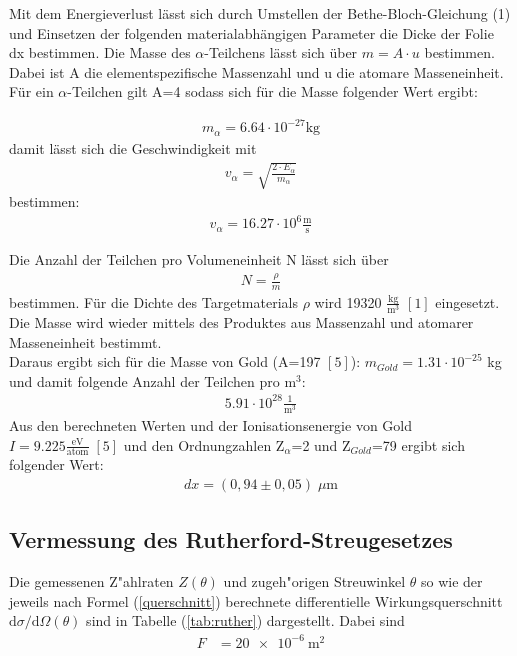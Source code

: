 Mit dem Energieverlust lässt sich durch Umstellen der Bethe-Bloch-Gleichung (1) und Einsetzen der folgenden materialabhängigen Parameter die Dicke der Folie dx bestimmen.  
Die Masse des $\alpha$-Teilchens lässt sich über $m=A \cdot u$ bestimmen. Dabei ist A die elementspezifische Massenzahl und u die atomare Masseneinheit. Für ein $\alpha$-Teilchen gilt A=4 sodass sich für die Masse folgender Wert ergibt: 

\begin{align*}
m_{\alpha}= 6.64 \cdot 10^{-27} \text{kg} 
\end{align*} 
damit lässt sich die Geschwindigkeit mit \begin{align*}
v_{\alpha}= \sqrt{\frac{2\cdot E_{\alpha}}{m_{\alpha}}} 
\end{align*} 
bestimmen:
\begin{align*}
v_{\alpha}=16.27 \cdot 10^{6} \frac{\text{m}}{\text{s}}
\end{align*} 

Die Anzahl der Teilchen pro Volumeneinheit N lässt sich über \begin{align}
N= \frac{\rho}{m} 
\end{align} bestimmen. Für die Dichte des Targetmaterials $\rho$ wird 19320 $\frac{\text{kg}}{\text{m}^3}$ $[1]$ eingesetzt. Die Masse wird wieder mittels des Produktes aus Massenzahl und atomarer Masseneinheit bestimmt. \\ Daraus ergibt sich für die Masse von Gold (A=197 $[5]$): $m_{Gold}=1.31 \cdot 10^{-25}$ kg und damit folgende  Anzahl der Teilchen pro $\text{m}^3$: 
 \begin{align*}
 5.91 \cdot 10^{28} \frac{1}{\text{m}^3}
 \end{align*} 
 Aus den berechneten Werten und der Ionisationsenergie von Gold $I=9.225 \frac{\text{eV}}{\text{atom}} \; [5]$ und den Ordnungzahlen Z$_{\alpha}$=2 und Z$_{Gold}$=79 ergibt sich folgender Wert:
 \begin{align*}
 dx= ( 0,94 \pm 0,05) \; \mu \text{m}
 \end{align*}

\subsection{Vermessung des Rutherford-Streugesetzes}
  Die gemessenen Z"ahlraten $Z(\theta)$ und zugeh"origen Streuwinkel $\theta$ so wie der jeweils nach Formel (\ref{querschnitt}) berechnete differentielle Wirkungsquerschnitt $\text{d}\sigma/\text{d}\Omega(\theta)$ sind in Tabelle (\ref{tab:ruther}) dargestellt.
  Dabei sind
  \begin{align*}
    F &= \SI{20e-6}{\meter \squared} \\
  \end{align*}


